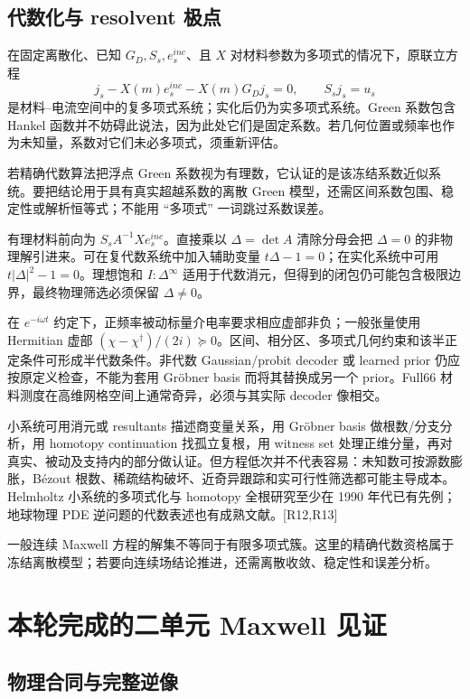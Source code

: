 \subsection{代数化与 resolvent 极点}

在固定离散化、已知 $G_D,S_s,e_s^{inc}$、且 $X$ 对材料参数为多项式的情况下，原联立方程
\begin{equation}
j_s-X(m)e_s^{inc}-X(m)G_Dj_s=0,\qquad S_sj_s=u_s
\end{equation}
是材料--电流空间中的复多项式系统；实化后仍为实多项式系统。Green 系数包含 Hankel 函数并不妨碍此说法，因为此处它们是固定系数。若几何位置或频率也作为未知量，系数对它们未必多项式，须重新评估。

若精确代数算法把浮点 Green 系数视为有理数，它认证的是该冻结系数近似系统。要把结论用于具有真实超越系数的离散 Green 模型，还需区间系数包围、稳定性或解析恒等式；不能用 ``多项式'' 一词跳过系数误差。

有理材料前向为 $S_sA^{-1}Xe_s^{inc}$。直接乘以 $\Delta=\det A$ 清除分母会把 $\Delta=0$ 的非物理解引进来。可在复代数系统中加入辅助变量 $t\Delta-1=0$；在实化系统中可用 $t|\Delta|^2-1=0$。理想饱和 $I:\Delta^\infty$ 适用于代数消元，但得到的闭包仍可能包含极限边界，最终物理筛选必须保留 $\Delta\ne0$。

在 $e^{-i\omega t}$ 约定下，正频率被动标量介电率要求相应虚部非负；一般张量使用 Hermitian 虚部 $(\chi-\chi^\dagger)/(2i)\succeq0$。区间、相分区、多项式几何约束和该半正定条件可形成半代数条件。非代数 Gaussian/probit decoder 或 learned prior 仍应按原定义检查，不能为套用 Gröbner basis 而将其替换成另一个 prior。Full66 材料测度在高维网格空间上通常奇异，必须与其实际 decoder 像相交。

小系统可用消元或 resultants 描述商变量关系，用 Gröbner basis 做根数/分支分析，用 homotopy continuation 找孤立复根，用 witness set 处理正维分量，再对真实、被动及支持内的部分做认证。但方程低次并不代表容易：未知数可按源数膨胀，Bézout 根数、稀疏结构破坏、近奇异跟踪和实可行性筛选都可能主导成本。Helmholtz 小系统的多项式化与 homotopy 全根研究至少在 1990 年代已有先例；地球物理 PDE 逆问题的代数表述也有成熟文献。[R12,R13]

一般连续 Maxwell 方程的解集不等同于有限多项式簇。这里的精确代数资格属于冻结离散模型；若要向连续场结论推进，还需离散收敛、稳定性和误差分析。

\section{本轮完成的二单元 Maxwell 见证}

\subsection{物理合同与完整逆像}

